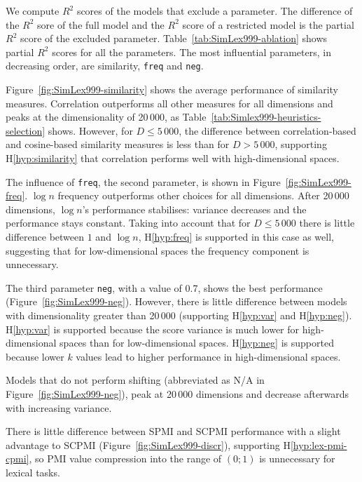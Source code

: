 



We compute $R^2$ scores of the models that exclude a parameter. The difference of the $R^2$ sore of the full model and the $R^2$ score of a restricted model is the partial $R^2$ score of the excluded parameter. Table~\ref{tab:SimLex999-ablation} shows partial $R^2$ scores for all the parameters. The most influential parameters, in decreasing order, are similarity, \texttt{freq} and \texttt{neg}.


Figure~\ref{fig:SimLex999-similarity} shows the average performance of similarity measures. Correlation outperforms all other measures for all dimensions and peaks at the dimensionality  of 20\,000, as Table~\ref{tab:Simlex999-heuristics-selection} shows. However, for $D \leq 5\,000$, the difference between correlation-based and cosine-based similarity measures is less than for $D > 5\,000$, supporting H\ref{hyp:similarity} that correlation performs well with high-dimensional spaces.

The influence of \texttt{freq}, the second parameter, is shown in Figure~\ref{fig:SimLex999-freq}. $\log n$ frequency outperforms other choices for all dimensions. After 20\,000 dimensions, $\log n$'s performance stabilises: variance decreases and the performance stays constant. Taking into account that for $D \leq 5\,000$ there is little difference between $1$ and $\log n$, H\ref{hyp:freq} is supported in this case as well, suggesting that for low-dimensional spaces the frequency component is unnecessary.


The third parameter \texttt{neg}, with a value of 0.7, shows the best performance (Figure~\ref{fig:SimLex999-neg}). However, there is little difference between models with dimensionality greater than 20\,000 (supporting H\ref{hyp:var} and H\ref{hyp:neg}). H\ref{hyp:var} is supported because the score variance is much lower for high-dimensional spaces than for low-dimensional spaces. H\ref{hyp:neg} is supported because lower $k$ values lead to higher performance in high-dimensional spaces.

Models that do not perform shifting (abbreviated as N/A in Figure~\ref{fig:SimLex999-neg}), peak at 20\,000 dimensions and decrease afterwards with increasing variance.

% 
There is little difference between SPMI and SCPMI performance with a slight advantage to SCPMI (Figure~\ref{fig:SimLex999-discr}), supporting H\ref{hyp:lex-pmi-cpmi}, so PMI value compression into the range of $(0; 1)$ is unnecessary for lexical tasks.

